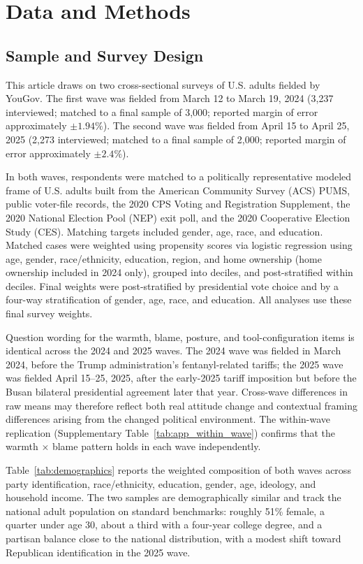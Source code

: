 \documentclass[12pt,letterpaper]{article}
\begin{document}
\section{Data and Methods}
\label{sec:data}

\subsection{Sample and Survey Design}

This article draws on two cross-sectional surveys of U.S. adults fielded by YouGov. The first wave was fielded from March 12 to March 19, 2024 (3,237 interviewed; matched to a final sample of 3,000; reported margin of error approximately $\pm 1.94\%$). The second wave was fielded from April 15 to April 25, 2025 (2,273 interviewed; matched to a final sample of 2,000; reported margin of error approximately $\pm 2.4\%$).

In both waves, respondents were matched to a politically representative modeled frame of U.S. adults built from the American Community Survey (ACS) PUMS, public voter-file records, the 2020 CPS Voting and Registration Supplement, the 2020 National Election Pool (NEP) exit poll, and the 2020 Cooperative Election Study (CES). Matching targets included gender, age, race, and education. Matched cases were weighted using propensity scores via logistic regression using age, gender, race/ethnicity, education, region, and home ownership (home ownership included in 2024 only), grouped into deciles, and post-stratified within deciles. Final weights were post-stratified by presidential vote choice and by a four-way stratification of gender, age, race, and education. All analyses use these final survey weights.

Question wording for the warmth, blame, posture, and tool-configuration items is identical across the 2024 and 2025 waves. The 2024 wave was fielded in March 2024, before the Trump administration's fentanyl-related tariffs; the 2025 wave was fielded April 15--25, 2025, after the early-2025 tariff imposition but before the Busan bilateral presidential agreement later that year. Cross-wave differences in raw means may therefore reflect both real attitude change and contextual framing differences arising from the changed political environment. The within-wave replication (Supplementary Table~\ref{tab:app_within_wave}) confirms that the warmth $\times$ blame pattern holds in each wave independently.

Table~\ref{tab:demographics} reports the weighted composition of both waves across party identification, race/ethnicity, education, gender, age, ideology, and household income. The two samples are demographically similar and track the national adult population on standard benchmarks: roughly 51\% female, a quarter under age 30, about a third with a four-year college degree, and a partisan balance close to the national distribution, with a modest shift toward Republican identification in the 2025 wave.
\end{document}
